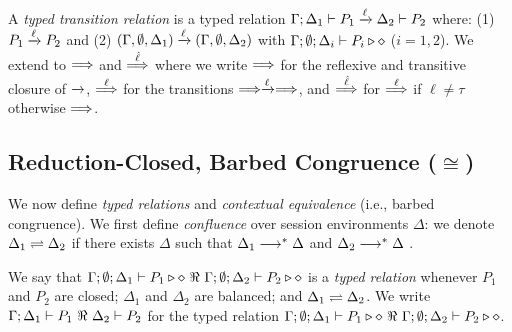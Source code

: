 \documentclass[a4paper,UKenglish]{lipics}
\theoremstyle{definition}
\begin{document}
\begin{definition}\label{d:tlts}\rm
A {\em typed transition relation} is a typed relation
$\Gamma; \Delta_1 \vdash P_1 \xrightarrow{\ell} \Delta_2 \vdash P_2$
	where:
%
(1) $P_1 \xrightarrow{\ell} P_2$ and (2) 
$(\Gamma, \emptyset, \Delta_1) \xrightarrow{\ell} (\Gamma, \emptyset, \Delta_2)$ 
with $\Gamma; \emptyset; \Delta_i \vdash P_i \triangleright \diamond$ 
($i=1,2$).
%
%
We extend to $\stackrel{}{\Longrightarrow}$ 
and $\stackrel{\hat{\ell}}{\Longrightarrow}$ 
where we write 
$\stackrel{}{\Longrightarrow}$ for the reflexive and
transitive closure of $\xrightarrow{}$, $\stackrel{\ell}{\Longrightarrow}$ for the transitions
$\stackrel{}{\Longrightarrow}\xrightarrow{\ell}\stackrel{}{\Longrightarrow}$, and $\stackrel{\hat{\ell}}{\Longrightarrow}$ for $\stackrel{\ell}{\Longrightarrow}$ if
$\ell\not = \tau$ otherwise $\stackrel{}{\Longrightarrow}$. 
\end{definition}

\subsection{Reduction-Closed, Barbed Congruence ($\cong$)}
\label{subsec:rc}
\noi We now define \emph{typed relations} and \emph{contextual equivalence} (i.e., barbed congruence).  
We first define \emph{confluence}
over session environments $\Delta$:
we denote $\Delta_1 \rightleftharpoons \Delta_2$ if there exists $\Delta$ such that
	$\Delta_1 \longrightarrow^\ast \Delta$ and $\Delta_2 \longrightarrow^\ast \Delta$
	.

\begin{definition}\rm %
	We say that
	$\Gamma; \emptyset; \Delta_1 \vdash P_1 \triangleright \diamond\ \Re \ \Gamma; \emptyset; \Delta_2 \vdash P_2 \triangleright \diamond$
	is a {\em typed relation} whenever $P_1$ and $P_2$ are closed;
		$\Delta_1$ and $\Delta_2$ are balanced; and 
		$\Delta_1 \rightleftharpoons \Delta_2$.
We write
$\horel{\Gamma}{\Delta_1}{P_1}{\ \Re \ }{\Delta_2}{P_2}$
for the typed relation $\Gamma; \emptyset; \Delta_1 \vdash P_1 \triangleright \diamond\ \Re \ \Gamma; \emptyset; \Delta_2 \vdash P_2 \triangleright \diamond$.
\end{definition}
\end{document}
